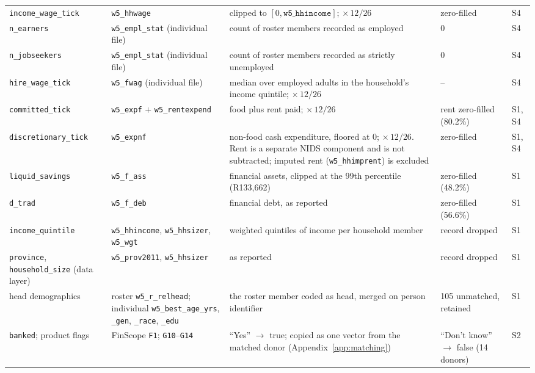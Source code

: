\begin{longtable}{H{3.0cm}H{3.2cm}L{3.8cm}L{2.0cm}L{1.3cm}}
\addlinespace
\texttt{income\_wage\_tick} & \texttt{w5\_hhwage} & clipped to $[0, \texttt{w5\_hhincome}]$; $\times\,12/26$ & zero-filled & S4 \\
\addlinespace
\texttt{n\_earners} & \texttt{w5\_empl\_stat} (individual file) & count of roster members recorded as employed & 0 & S4 \\
\addlinespace
\texttt{n\_jobseekers} & \texttt{w5\_empl\_stat} (individual file) & count of roster members recorded as strictly unemployed & 0 & S4 \\
\addlinespace
\texttt{hire\_wage\_tick} & \texttt{w5\_fwag} (individual file) & median over employed adults in the household's income quintile; $\times\,12/26$ & -- & S4 \\
\addlinespace
\texttt{committed\_tick} & \texttt{w5\_expf} $+$ \texttt{w5\_rentexpend} & food plus rent paid; $\times\,12/26$ & rent zero-filled (80.2\%) & S1, S4 \\
\addlinespace
\texttt{discretionary\_\allowbreak tick} & \texttt{w5\_expnf} & non-food cash expenditure, floored at 0; $\times\,12/26$. Rent is a separate \ac{NIDS} component and is not subtracted; imputed rent (\texttt{w5\_hhimprent}) is excluded & zero-filled & S1, S4 \\
\addlinespace
\texttt{liquid\_savings} & \texttt{w5\_f\_ass} & financial assets, clipped at the 99th percentile (R133{,}662) & zero-filled (48.2\%) & S1 \\
\addlinespace
\texttt{d\_trad} & \texttt{w5\_f\_deb} & financial debt, as reported & zero-filled (56.6\%) & S1 \\
\addlinespace
\texttt{income\_quintile} & \texttt{w5\_hhincome}, \texttt{w5\_hhsizer}, \texttt{w5\_wgt} & weighted quintiles of income per household member & record dropped & S1 \\
\addlinespace
\texttt{province}, \texttt{household\_size} (data layer) & \texttt{w5\_prov2011}, \texttt{w5\_hhsizer} & as reported & record dropped & S1 \\
\addlinespace
head demographics & roster \texttt{w5\_r\_relhead}; individual \texttt{w5\_best\_age\_yrs}, \texttt{\_gen}, \texttt{\_race}, \texttt{\_edu} & the roster member coded as head, merged on person identifier & 105 unmatched, retained & S1 \\
\addlinespace
\texttt{banked}; product flags & \ac{FinScope} \texttt{F1}; \texttt{G10}--\texttt{G14} & ``Yes'' $\to$ true; copied as one vector from the matched donor (Appendix~\ref{app:matching}) & ``Don't know'' $\to$ false (14 donors) & S2 \\

\end{longtable}
